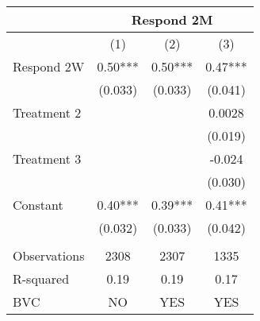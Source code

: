 \begin{tabular}{lccc}
\toprule
      & \multicolumn{3}{c}{Respond 2M} \\
\midrule
\midrule
      & (1)   & (2)   & (3) \\
\midrule
\midrule
Respond 2W & 0.50*** & 0.50*** & 0.47*** \\
      & (0.033) & (0.033) & (0.041) \\
Treatment 2 &       &       & 0.0028 \\
      &       &       & (0.019) \\
Treatment 3 &       &       & -0.024 \\
      &       &       & (0.030) \\
Constant & 0.40*** & 0.39*** & 0.41*** \\
      & (0.032) & (0.033) & (0.042) \\
      &       &       &  \\
\midrule
Observations & 2308  & 2307  & 1335 \\
R-squared & 0.19  & 0.19  & 0.17 \\
BVC   & NO    & YES   & YES \\
\bottomrule
\bottomrule
\end{tabular}%
